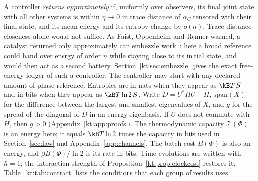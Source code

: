 A controller \emph{returns approximately} if, uniformly over observers, its final joint state with all other systems is within $\eta\to0$ in trace distance of $\alpha_C$ tensored with their final state, and its mean energy and its entropy change by $o(n)$. Trace-distance closeness alone would not suffice. As Faist, Oppenheim and Renner warned, a catalyst returned only approximately can embezzle work~\cite{FOR15}: here a broad reference could hand over energy of order $n$ while staying close to its initial state, and would then act as a second battery. Section~\ref{kt:sec:embezzle} gives the exact free-energy ledger of such a controller. The controller may start with any declared amount of phase reference. Entropies are in nats when they appear as $\kB T\,S$ and in bits when they appear as $\kB T\ln2\,S$. Write $D=U^*HU-H$, $\mathrm{span}(X)$ for the difference between the largest and smallest eigenvalues of $X$, and $g$ for the spread of the diagonal of $D$ in an energy eigenbasis. If $U$ does not commute with $H$, then $g>0$ (Appendix~\ref{kt:app:proofs}). The thermodynamic capacity $\mathcal T(\Phi)$ is an energy here; it equals $\kB T\ln2$ times the capacity in bits used in Section~\ref{sec:law} and Appendix~\ref{app:channels}. The batch cost $B(\Phi)$ is also an energy, and $\beta B(\Phi)/\ln2$ is its rate in bits. Time evolutions are written with $\hbar=1$; the interaction strength of Proposition~\ref{kt:prop:clockcost} restores it. Table~\ref{kt:tab:contract} lists the conditions that each group of results uses.

